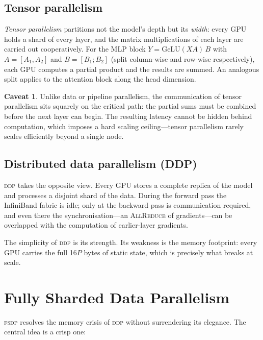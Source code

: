 \documentclass[11pt,a4paper]{article}
\theoremstyle{definition}
\newtheorem*{warning}{Caveat}
\theoremstyle{remark}
\newcommand{\FSDP}{\textsc{fsdp}}
\newcommand{\DDP}{\textsc{ddp}}
\newcommand{\AllReduce}{\textsc{AllReduce}}
\begin{document}
\subsection{Tensor parallelism}

\emph{Tensor parallelism} partitions not the model's depth but its \emph{width}: every GPU holds a shard of every layer, and the matrix multiplications of each layer are carried out cooperatively. For the MLP block $Y = \mathrm{GeLU}(XA)\,B$ with $A = [A_1, A_2]$ and $B = [B_1; B_2]$ (split column-wise and row-wise respectively), each GPU computes a partial product and the results are summed. An analogous split applies to the attention block along the head dimension.

\begin{warning}
Unlike data or pipeline parallelism, the communication of tensor parallelism sits squarely on the critical path: the partial sums must be combined before the next layer can begin. The resulting latency cannot be hidden behind computation, which imposes a hard scaling ceiling---tensor parallelism rarely scales efficiently beyond a single node.
\end{warning}

\subsection{Distributed data parallelism (DDP)}

\DDP{} takes the opposite view. Every GPU stores a complete replica of the model and processes a disjoint shard of the data. During the forward pass the InfiniBand fabric is idle; only at the backward pass is communication required, and even there the synchronisation---an \AllReduce{} of gradients---can be overlapped with the computation of earlier-layer gradients.

The simplicity of \DDP{} is its strength. Its weakness is the memory footprint: every GPU carries the full 16$P$ bytes of static state, which is precisely what breaks at scale.

\section{Fully Sharded Data Parallelism}


\FSDP{} resolves the memory crisis of \DDP{} without surrendering its elegance. The central idea is a crisp one:
\end{document}
